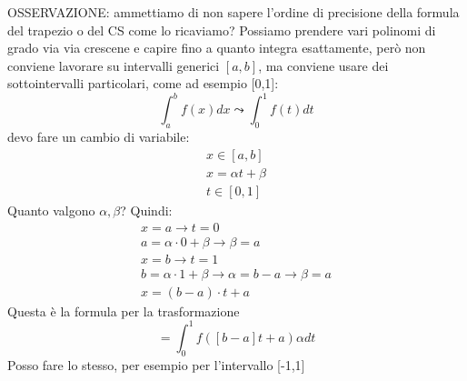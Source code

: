 \documentclass[a4paper, portrait]{book}
\numberwithin{equation}{chapter} %
\begin{document}
OSSERVAZIONE: ammettiamo di non sapere l'ordine di precisione della formula del trapezio o del CS come lo ricaviamo? Possiamo prendere vari polinomi di grado via via crescene e capire fino a quanto integra esattamente, però non conviene lavorare su intervalli generici $[a,b]$, ma conviene usare dei sottointervalli particolari, come ad esempio [0,1]:
\begin{equation}
    \int_a^b f(x) dx \leadsto \int_0^1 f(t) dt
\end{equation}
devo fare un cambio di variabile:
\begin{gather}
    x \in [a,b]\\
    x = \alpha t + \beta\\
    t \in [0,1]
\end{gather}
Quanto valgono $\alpha, \beta$?
Quindi:
\begin{gather}
    x = a \rightarrow t = 0\\
    a = \alpha \cdot 0 + \beta \rightarrow \beta = a\\
    x = b \rightarrow t = 1\\
    b = \alpha \cdot 1 + \beta \rightarrow \alpha = b-a \rightarrow \beta = a\\
    x = (b-a)\cdot t +a
\end{gather}
Questa è la formula per la trasformazione
\begin{equation}
    = \int_0^1 f([b-a] t + a) \alpha dt 
\end{equation}
Posso fare lo stesso, per esempio per l'intervallo [-1,1]
\end{document}
